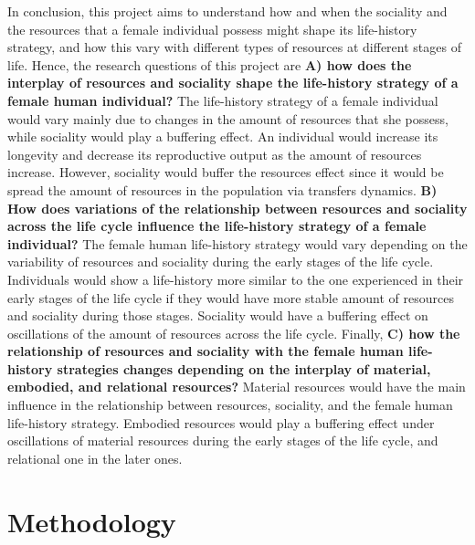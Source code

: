 \documentclass{article}
\begin{document}
In conclusion, this project aims to understand how and when the sociality and the resources that a female individual possess might shape its life-history strategy, and how this vary with different types of resources at different stages of life. Hence, the research questions of this project are \textbf{A) how does the interplay of resources and sociality shape the life-history strategy of a female human individual?} The life-history strategy of a female individual would vary mainly due to changes in the amount of resources that she possess, while sociality would play a buffering effect. An individual would increase its longevity and decrease its reproductive output as the amount of resources increase. However, sociality would buffer the resources effect since it would be spread the amount of resources in the population via transfers dynamics. \textbf{B) How does variations of the relationship between resources and sociality across the life cycle influence the life-history strategy of a female individual?} The female human life-history strategy would vary depending on the variability of resources and sociality during the early stages of the life cycle. Individuals would show a life-history more similar to the one experienced in their early stages of the life cycle if they would have more stable amount of resources and sociality during those stages. Sociality would have a buffering effect on oscillations of the amount of resources across the life cycle. Finally, \textbf{C) how the relationship of resources and sociality with the female human life-history strategies changes depending on the interplay of material, embodied, and relational resources?} Material resources would have the main influence in the relationship between resources, sociality, and the female human life-history strategy. Embodied resources would play a buffering effect under oscillations of material resources during the early stages of the life cycle, and relational one in the later ones.

\section{Methodology}
\end{document}
